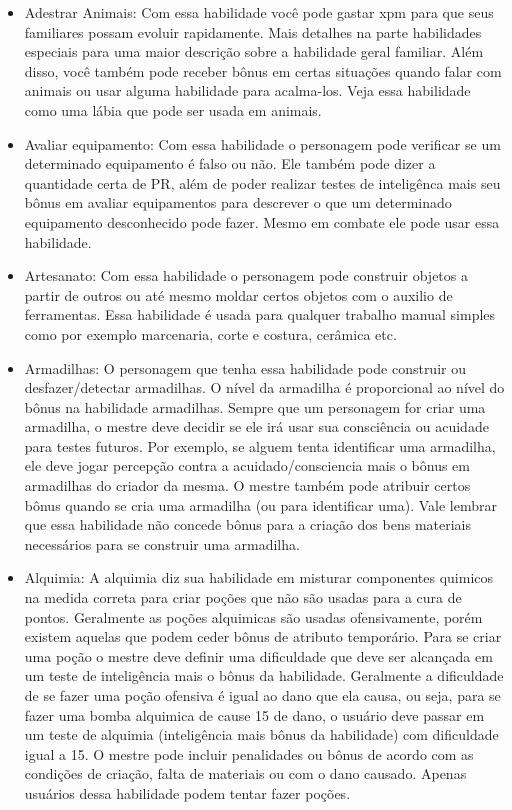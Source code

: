 \begin{itemize}
	\item Adestrar Animais: Com essa habilidade você pode gastar xpm para que seus familiares possam evoluir rapidamente. Mais detalhes na parte habilidades especiais para uma maior descrição sobre a habilidade geral familiar. Além disso, você também pode receber bônus em certas situações quando falar com animais ou usar alguma habilidade para acalma-los. Veja essa habilidade como uma lábia que pode ser usada em animais.
	
	\item Avaliar equipamento: Com essa habilidade o personagem pode verificar se um determinado equipamento é falso ou não. Ele também pode dizer a quantidade certa de PR, além de poder realizar testes de inteligênca mais seu bônus em avaliar equipamentos para descrever o que um determinado equipamento desconhecido pode fazer. Mesmo em combate ele pode usar essa habilidade.
	
	\item Artesanato: Com essa habilidade o personagem pode construir objetos a partir de outros ou até mesmo moldar certos objetos com o auxilio de ferramentas. Essa habilidade é usada para qualquer trabalho manual simples como por exemplo marcenaria, corte e costura, cerâmica etc.
	
	\item Armadilhas: O personagem que tenha essa habilidade pode construir ou desfazer/detectar armadilhas. O nível da armadilha é proporcional ao nível do bônus na habilidade armadilhas. Sempre que um personagem for criar uma armadilha, o mestre deve decidir se ele irá usar sua consciência ou acuidade para testes futuros. Por exemplo, se alguem tenta identificar uma armadilha, ele deve jogar percepção contra a acuidado/consciencia mais o bônus em armadilhas do criador da mesma. O mestre também pode atribuir certos bônus quando se cria uma armadilha (ou para identificar uma). Vale lembrar que essa habilidade não concede bônus para a criação dos bens materiais necessários para se construir uma armadilha.  
	
	\item Alquimia: A alquimia diz sua habilidade em misturar componentes quimicos na medida correta para criar poções que não são usadas para a cura de pontos. Geralmente as poções alquimicas são usadas ofensivamente, porém existem aquelas que podem ceder bônus de atributo temporário. Para se criar uma poção o mestre deve definir uma dificuldade que deve ser alcançada em um teste de inteligência mais o bônus da habilidade. Geralmente a dificuldade de se fazer uma poção ofensiva é igual ao dano que ela causa, ou seja, para se fazer uma bomba alquimica de cause 15 de dano, o usuário deve passar em um teste de alquimia (inteligência mais bônus da habilidade) com dificuldade igual a 15. O mestre pode incluir penalidades ou bônus de acordo com as condições de criação, falta de materiais ou com o dano causado. Apenas usuários dessa habilidade podem tentar fazer poções.  
	

\end{itemize}
